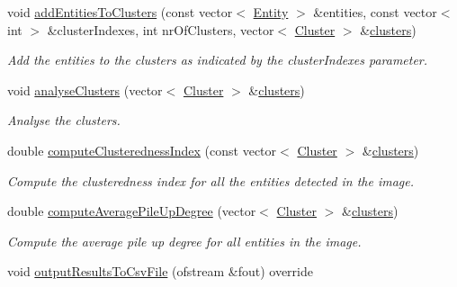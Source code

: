 \begin{DoxyCompactItemize}
void \hyperlink{classmultiscale_1_1analysis_1_1ClusterDetector_aefc4d0736d8af4ab53f1e5e76440f447}{add\-Entities\-To\-Clusters} (const vector$<$ \hyperlink{classmultiscale_1_1analysis_1_1Entity}{Entity} $>$ \&entities, const vector$<$ int $>$ \&cluster\-Indexes, int nr\-Of\-Clusters, vector$<$ \hyperlink{classmultiscale_1_1analysis_1_1Cluster}{Cluster} $>$ \&\hyperlink{classmultiscale_1_1analysis_1_1ClusterDetector_aa81a8649bc743389c2fc1919d47eb5b3}{clusters})
\begin{DoxyCompactList}\small\item\em Add the entities to the clusters as indicated by the cluster\-Indexes parameter. \end{DoxyCompactList}\item 
void \hyperlink{classmultiscale_1_1analysis_1_1ClusterDetector_af994e960ba3cd76cc67e714ea276264a}{analyse\-Clusters} (vector$<$ \hyperlink{classmultiscale_1_1analysis_1_1Cluster}{Cluster} $>$ \&\hyperlink{classmultiscale_1_1analysis_1_1ClusterDetector_aa81a8649bc743389c2fc1919d47eb5b3}{clusters})
\begin{DoxyCompactList}\small\item\em Analyse the clusters. \end{DoxyCompactList}\item 
double \hyperlink{classmultiscale_1_1analysis_1_1ClusterDetector_aaa7937daf9872614e09b23cb4f6e5aa8}{compute\-Clusteredness\-Index} (const vector$<$ \hyperlink{classmultiscale_1_1analysis_1_1Cluster}{Cluster} $>$ \&\hyperlink{classmultiscale_1_1analysis_1_1ClusterDetector_aa81a8649bc743389c2fc1919d47eb5b3}{clusters})
\begin{DoxyCompactList}\small\item\em Compute the clusteredness index for all the entities detected in the image. \end{DoxyCompactList}\item 
double \hyperlink{classmultiscale_1_1analysis_1_1ClusterDetector_a1efab8446c79feb8a9285d895bb64b05}{compute\-Average\-Pile\-Up\-Degree} (vector$<$ \hyperlink{classmultiscale_1_1analysis_1_1Cluster}{Cluster} $>$ \&\hyperlink{classmultiscale_1_1analysis_1_1ClusterDetector_aa81a8649bc743389c2fc1919d47eb5b3}{clusters})
\begin{DoxyCompactList}\small\item\em Compute the average pile up degree for all entities in the image. \end{DoxyCompactList}\item 
void \hyperlink{classmultiscale_1_1analysis_1_1ClusterDetector_a6137f44f74afcac0584b1ff3f49f0ab8}{output\-Results\-To\-Csv\-File} (ofstream \&fout) override

\end{DoxyCompactItemize}
